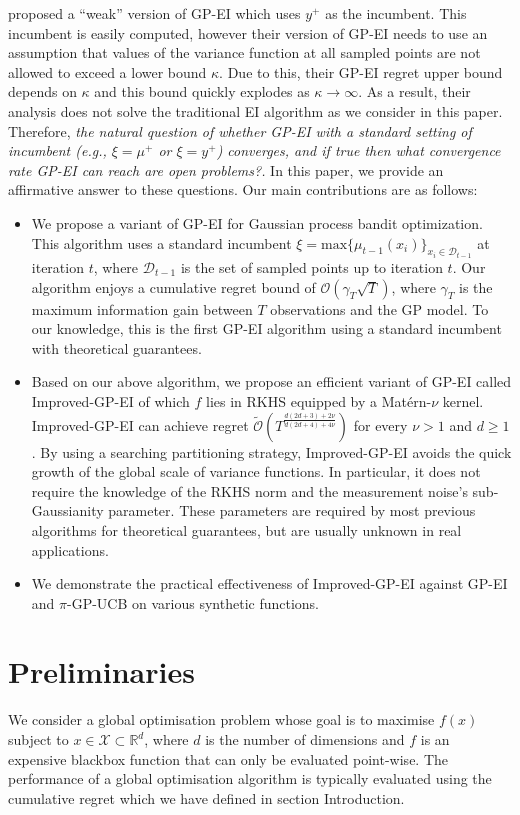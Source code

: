 \documentclass[twoside]{article}
\begin{document}
\citet{nguyen17a} proposed a ``weak” version of GP-EI which uses $y^+$ as the incumbent. This incumbent is easily computed, however their version of GP-EI needs to use an assumption that values of the variance function at all sampled points are not allowed to exceed a lower bound $\kappa$. Due to this, their GP-EI regret upper bound depends on $\kappa$ and this bound quickly explodes as $\kappa \rightarrow \infty$. As a result, their analysis does not solve the traditional EI algorithm as we consider in this paper.
Therefore, \emph{the natural question of whether GP-EI with a standard setting of incumbent (e.g., $\xi = \mu^+$ or $\xi = y^+$) converges, and if true then what convergence rate GP-EI can reach are open problems?.} In this paper, we provide an affirmative answer to these questions. Our main contributions are as follows:
\begin{itemize}
  \item We propose a variant of GP-EI  for Gaussian process bandit optimization. This algorithm uses a standard incumbent $\xi = \text{max} \{\mu_{t-1}(x_i)\}_{x_i \in \mathcal D_{t-1}}$ at iteration $t$, where $\mathcal D_{t-1}$ is the set of sampled points up to iteration $t$. Our algorithm enjoys a cumulative regret bound of $\mathcal O(\gamma_T\sqrt{T})$, where $\gamma_T$ is the maximum information gain between $T$ observations and the GP model. To our knowledge, this is the first GP-EI algorithm using a standard incumbent with theoretical guarantees.

  \item Based on our above algorithm, we propose an efficient variant of GP-EI called Improved-GP-EI of which $f$ lies in RKHS equipped by a Mat\'ern-$\nu$ kernel. Improved-GP-EI can achieve regret $\tilde{\mathcal O}(T^{\frac{d(2d+3) + 2\nu}{d(2d+4) + 4\nu}})$ for every $\nu > 1$ and $d \ge 1$. By using a searching partitioning strategy, Improved-GP-EI avoids the quick growth of the global scale of variance functions. In particular, it does not require the knowledge of the RKHS norm and the measurement noise's sub-Gaussianity parameter. These parameters are required by most previous algorithms for theoretical guarantees, but are usually unknown in real applications.

  \item We demonstrate the practical effectiveness of Improved-GP-EI against GP-EI and $\pi$-GP-UCB on various synthetic functions.
\end{itemize}

\section{Preliminaries}
We consider a global optimisation problem whose goal is to maximise $f(x)$ subject to $x \in \mathcal X \subset \mathbb{R}^d$, where $d$ is the number of dimensions and $f$ is an expensive blackbox function that can only be evaluated point-wise. The performance of a global optimisation algorithm is typically evaluated using the cumulative regret which we have defined in section Introduction.
\end{document}
